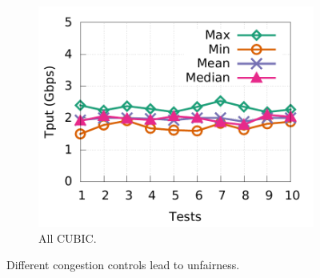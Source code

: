 \begin{figure}[!t]
\begin{subfigure}[b]{0.225\textwidth}
                \includegraphics[width=\textwidth]{figures/tput_fairness/default_all_cubic_tput.pdf}
                \caption{All CUBIC.}
                \label{unfairness_all_cubic}
        \end{subfigure}
        \caption{Different congestion controls lead to unfairness.}
        \label{tput_unfair}
\end{figure}

